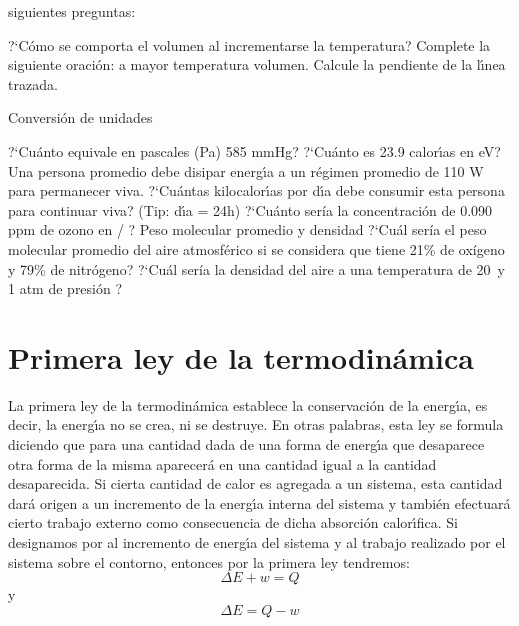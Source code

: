 \begin{exercises}
siguientes preguntas:

\subexer ?`C\'omo se comporta  el volumen al incrementarse la
temperatura?
\subexer Complete la siguiente oraci\'on: a mayor temperatura \hrulefill
\hskip 1mm volumen.
\subexer Calcule la pendiente de la l\'{\i}nea trazada.


\exer Conversi\'on de unidades

\subexer  ?`Cu\'anto equivale en pascales (Pa) 585 mmHg?
\subexer ?`Cu\'anto es 23.9 calor\'{\i}as en eV?
\subexer Una persona promedio debe disipar energ\'{\i}a a un
r\'egimen promedio de 110 W para permanecer viva.  ?`Cu\'antas kilocalor\'{\i}as por d\'{\i}a debe consumir
esta persona para continuar viva? (Tip: d\'{\i}a = 24h) 
\subexer  ?`Cu\'anto sería la concentración de 0.090 ppm de ozono en \milli\gram / \cubic\metre ?
\exer Peso molecular promedio y densidad
\subexer ?`Cu\'al sería el peso molecular promedio del aire atmosférico si se considera que tiene 21\% de oxígeno y 79\% de nitrógeno? 
\subexer ?`Cu\'al sería la densidad del aire a una temperatura de 20\celsius\, y 1 atm de presión ? 
\end{exercises}

\section{Primera ley de la termodin\'amica}
La primera ley de la termodin\'amica establece la conservaci\'on de la
energ\'{\i}a, es decir, la energ\'{\i}a no se crea, ni se destruye. En otras
palabras, esta ley se formula diciendo que para una cantidad dada de
una forma de e\-nerg\'{\i}a que desaparece otra forma de la misma
aparecer\'a en una cantidad igual a la cantidad desaparecida.
Si cierta cantidad de calor  es agregada a un sistema, esta cantidad dar\'a origen a un incremento de la energ\'{\i}a interna del sistema
y tambi\'en efectuar\'a cierto trabajo externo como consecuencia de dicha absorci\'on calor\'{\i}fica. Si designamos por  al incremento de
energ\'{\i}a del sistema y  al trabajo realizado por el sistema sobre el contorno, entonces por la primera ley tendremos:
\begin{equation}
\Delta E + w = Q
\end{equation}
y
\begin{equation}
\Delta E = Q - w
\end{equation}

